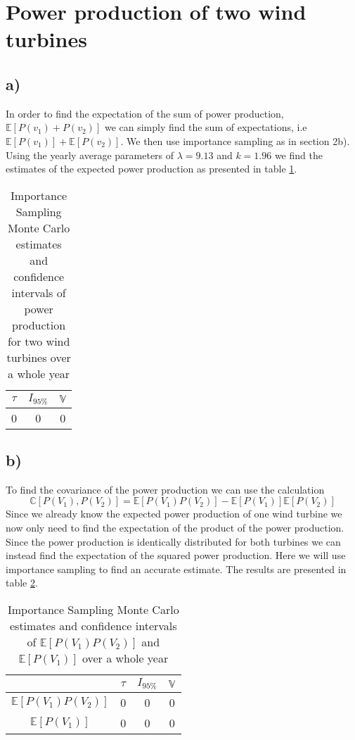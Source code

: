 \documentclass[a4paper]{article}
\begin{document}
\newpage
\section*{Power production of two wind turbines}

\subsection*{a)}
In order to find the expectation of the sum of power production, $\mathbb{E}[P(v_1) + P(v_2)]$ we can simply find the sum of expectations, i.e $\mathbb{E}[P(v_1)] + \mathbb{E}[P(v_2)]$. We then use importance sampling as in section 2b). Using the yearly average parameters of $\lambda = 9.13$ and $k = 1.96$ we find the estimates of the expected power production as presented in table \ref{IS2results}.


\begin{table}
    \centering
    \caption{Importance Sampling Monte Carlo estimates and confidence intervals of power production for two wind turbines over a whole year}
    \label{IS2results}
    \begin{tabular}{| c c c ||}
        \hline
        $\tau$ & $I_{95\%}$ & $\mathbb{V}$ \\
        \hline\hline
        0 & 0 & 0 \\
        \hline
    \end{tabular}
\end{table}

\subsection*{b)}
To find the covariance of the power production we can use the calculation
\begin{equation}
     \mathbb{C}[P(V_1), P(V_2)] = \mathbb{E}[P(V_1)P(V_2)] - \mathbb{E}[P(V_1)]\mathbb{E}[P(V_2)]
\end{equation}
Since we already know the expected power production of one wind turbine we now only need to find the expectation of the product of the power production. Since the power production is identically distributed for both turbines we can instead find the expectation of the squared power production. Here we will use importance sampling to find an accurate estimate. The results are presented in table \ref{Covresults}.



\begin{table}
    \centering
    \caption{Importance Sampling Monte Carlo estimates and confidence intervals of $\mathbb{E}[P(V_1)P(V_2)]$ and $\mathbb{E}[P(V_1)]$ over a whole year}
    \label{Covresults}
    \begin{tabular}{|c|| c c c ||}
        \hline
        & $\tau$ & $I_{95\%}$ & $\mathbb{V}$ \\
        \hline\hline
        $\mathbb{E}[P(V_1)P(V_2)]$ & 0 & 0 & 0 \\
        \hline
        $\mathbb{E}[P(V_1)]$ & 0 & 0 & 0 \\
        \hline
    \end{tabular}
\end{table}
\end{document}
